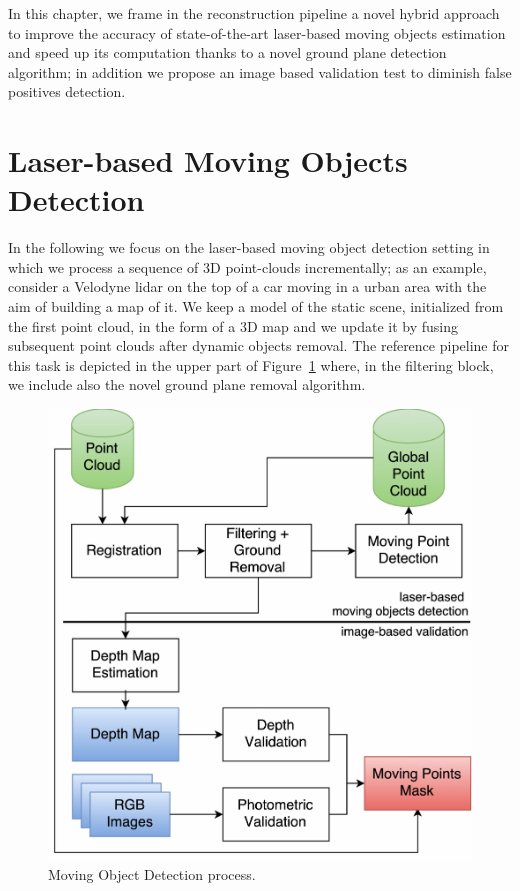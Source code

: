 In this chapter, we frame in the reconstruction pipeline a novel hybrid approach to improve the accuracy of state-of-the-art laser-based moving objects estimation and speed up its computation thanks to a novel ground plane detection algorithm; in addition we propose an image based validation test to diminish false positives detection. 



\section{Laser-based Moving Objects Detection}%
\label{sec:lidar}
In the following we focus on the laser-based moving object detection setting in which we process a sequence of 3D point-clouds incrementally; as an example, consider a Velodyne lidar on the top of a car moving in a urban area with the aim of building a map of it. 
We keep a model of the static scene, initialized from the first point cloud, in the form of a 3D map and we update it by fusing subsequent point clouds after dynamic objects removal. 
The reference pipeline for this task is depicted in the upper part of Figure~\ref{fig:algo} where, in the filtering block, we include also the novel ground plane removal algorithm.

\begin{figure}[t]
\centering
\includegraphics[width=0.77\columnwidth]{./img/ch-laser/MovingPointDetection}
\caption{Moving Object Detection process.}
\label{fig:algo}
\end{figure}
%
